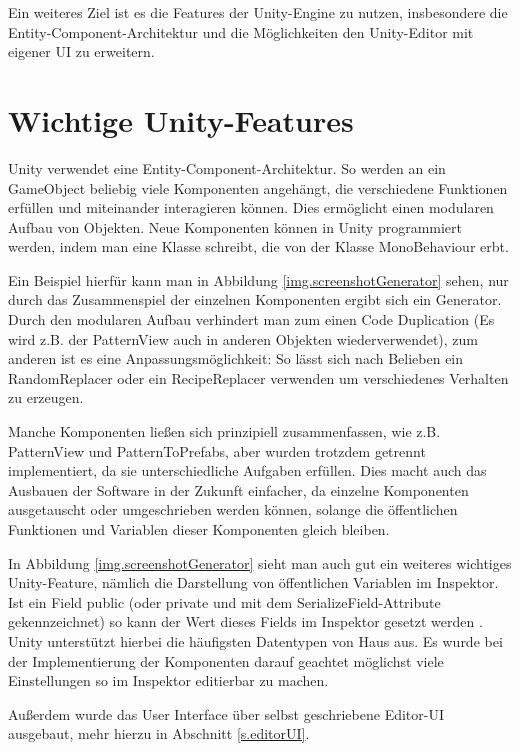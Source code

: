 Ein weiteres Ziel ist es die Features der Unity-Engine zu nutzen, insbesondere die Entity-Component-Architektur und die Möglichkeiten den Unity-Editor mit eigener UI zu erweitern. 

\section{Wichtige Unity-Features}

Unity verwendet eine Entity-Component-Architektur. So werden an ein GameObject beliebig viele Komponenten angehängt, die verschiedene Funktionen erfüllen und miteinander interagieren können. Dies ermöglicht einen modularen Aufbau von Objekten. 
\cite[Seite: GameObjects]{unityManual}
Neue Komponenten können in Unity programmiert werden, indem man eine Klasse schreibt, die von der Klasse MonoBehaviour erbt.
\cite[Seite: CreatingAndUsingScripts]{unityManual}

Ein Beispiel hierfür kann man in Abbildung \ref{img.screenshotGenerator} sehen, nur durch das Zusammenspiel der einzelnen Komponenten ergibt sich ein Generator. Durch den modularen Aufbau verhindert man zum einen Code Duplication (Es wird z.B. der PatternView auch in anderen Objekten wiederverwendet), zum anderen ist es eine Anpassungsmöglichkeit: So lässt sich nach Belieben ein RandomReplacer oder ein RecipeReplacer verwenden um verschiedenes Verhalten zu erzeugen. 

Manche Komponenten ließen sich prinzipiell zusammenfassen, wie z.B. PatternView und PatternToPrefabs, aber wurden trotzdem getrennt implementiert, da sie unterschiedliche Aufgaben erfüllen. Dies macht auch das Ausbauen der Software in der Zukunft einfacher, da einzelne Komponenten ausgetauscht oder umgeschrieben werden können, solange die öffentlichen Funktionen und Variablen dieser Komponenten gleich bleiben.

In Abbildung \ref{img.screenshotGenerator} sieht man auch gut ein weiteres wichtiges Unity-Feature, nämlich die Darstellung von öffentlichen Variablen im Inspektor. Ist ein Field public (oder private und mit dem SerializeField-Attribute gekennzeichnet) so kann der Wert dieses Fields im Inspektor gesetzt werden \cite[Seite: VariablesAndTheInspector]{unityManual} \cite[Seite: SerializeField]{unitySciptingReference}. Unity unterstützt hierbei die häufigsten Datentypen von Haus aus. Es wurde bei der Implementierung der Komponenten darauf geachtet möglichst viele Einstellungen so im Inspektor editierbar zu machen.

Außerdem wurde das User Interface über selbst geschriebene Editor-UI ausgebaut, mehr hierzu in Abschnitt \ref{s.editorUI}.

